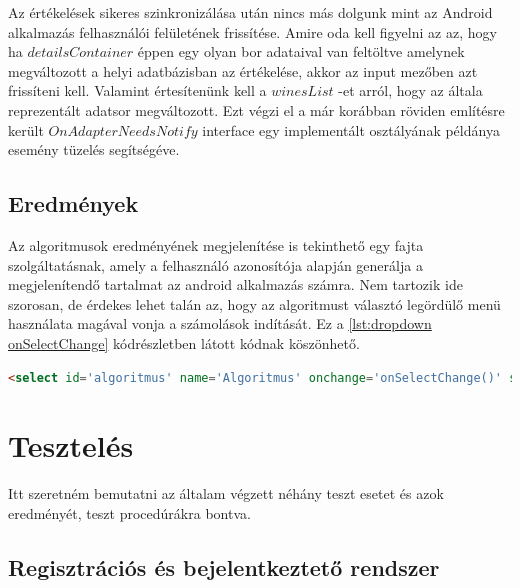 \documentclass[12pt]{report}
\theoremstyle{definition}
\begin{document}
	Az értékelések sikeres szinkronizálása után nincs más dolgunk mint az Android alkalmazás felhasználói felületének frissítése. Amire oda kell figyelni az az, hogy ha \linebreak$detailsContainer$ éppen egy olyan bor adataival van feltöltve amelynek megváltozott a helyi adatbázisban az értékelése, akkor az input mezőben azt frissíteni kell. Valamint értesítenünk kell a $winesList$ -et arról, hogy az általa reprezentált adatsor megváltozott. Ezt végzi el a már korábban röviden említésre került $OnAdapterNeedsNotify$ interface egy implementált osztályának példánya esemény tüzelés segítségéve.
	
	\section{Eredmények}
	Az algoritmusok eredményének megjelenítése is tekinthető egy fajta szolgáltatásnak, amely a felhasználó azonosítója alapján generálja a megjelenítendő tartalmat az android alkalmazás számra. Nem tartozik ide szorosan, de érdekes lehet talán az, hogy az algoritmust választó legördülő menü használata magával vonja a számolások indítását. Ez a \ref{lst:dropdown onSelectChange} kódrészletben látott kódnak köszönhető.
	
	\noindent\begin{minipage}{\linewidth}
		\begin{lstlisting}[language=html,label={lst:dropdown onSelectChange}, caption={Legordülő menübeli algoritmus választás egyből indítja a számolást}]
<select id='algoritmus' name='Algoritmus' onchange='onSelectChange()' style="width: 100%;">
		\end{lstlisting}
	\end{minipage}
	
	
	\chapter{Tesztelés}
	Itt szeretném bemutatni az általam végzett néhány teszt esetet és azok eredményét, teszt procedúrákra bontva.
	
	\setcounter{TP}{1}
	\setcounter{TC}{1}
	
	\section{Regisztrációs és bejelentkeztető rendszer}
	
	
\end{document}
